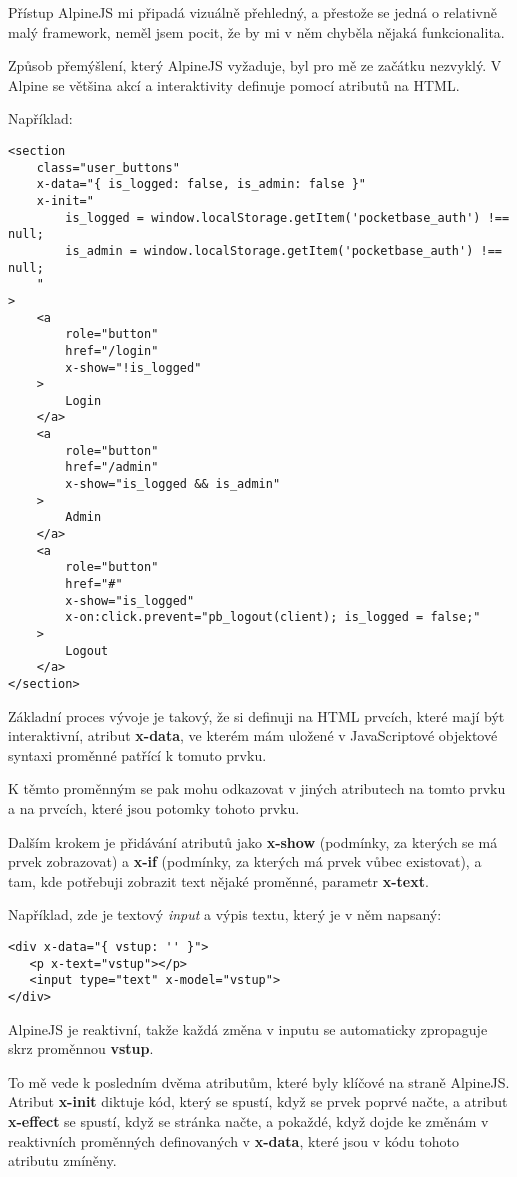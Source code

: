 \documentclass[11pt,a4paper,twoside,openright]{report}
\begin{document}
Přístup AlpineJS mi připadá vizuálně přehledný, a přestože se jedná o relativně malý framework, neměl jsem
pocit, že by mi v něm chyběla nějaká funkcionalita.

Způsob přemýšlení, který AlpineJS vyžaduje, byl pro mě ze začátku nezvyklý. V Alpine se většina akcí a interaktivity
definuje pomocí atributů na HTML.

Například:

\begin{verbatim}
<section
	class="user_buttons"
	x-data="{ is_logged: false, is_admin: false }"
	x-init="
		is_logged = window.localStorage.getItem('pocketbase_auth') !== null;
		is_admin = window.localStorage.getItem('pocketbase_auth') !== null;
	"
>
    <a
    	role="button"
    	href="/login"
    	x-show="!is_logged"
    >
    	Login
    </a>
    <a
    	role="button"
    	href="/admin"
    	x-show="is_logged && is_admin"
    >
        Admin
    </a>
    <a
        role="button"
        href="#"
        x-show="is_logged"
        x-on:click.prevent="pb_logout(client); is_logged = false;"
    >
    	Logout
    </a>
</section>
\end{verbatim}

Základní proces vývoje je takový, že si definuji na HTML prvcích, které mají být interaktivní,
atribut \textbf{x-data}, ve kterém mám uložené v JavaScriptové objektové syntaxi proměnné patřící
k tomuto prvku.

K těmto proměnným se pak mohu odkazovat v jiných atributech na tomto prvku a na prvcích, které jsou
potomky tohoto prvku.

Dalším krokem je přidávání atributů jako \textbf{x-show} (podmínky, za kterých se má prvek zobrazovat)
a \textbf{x-if} (podmínky, za kterých má prvek vůbec existovat), a tam, kde potřebuji zobrazit text
nějaké proměnné, parametr \textbf{x-text}.

Například, zde je textový \emph{input} a výpis textu, který je v něm napsaný:

\begin{verbatim}
<div x-data="{ vstup: '' }">
   <p x-text="vstup"></p>
   <input type="text" x-model="vstup">
</div>
\end{verbatim}

AlpineJS je reaktivní, takže každá změna v inputu se automaticky zpropaguje skrz proměnnou \textbf{vstup}.

To mě vede k posledním dvěma atributům, které byly klíčové na straně AlpineJS. Atribut \textbf{x-init}
diktuje kód, který se spustí, když se prvek poprvé načte, a atribut \textbf{x-effect} se spustí, když
se stránka načte, a pokaždé, když dojde ke změnám v reaktivních proměnných definovaných v \textbf{x-data},
které jsou v kódu tohoto atributu zmíněny.
\end{document}
